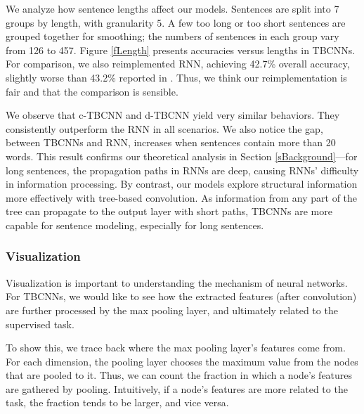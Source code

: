 \documentclass[11pt,a4paper]{article}
\begin{document}
We analyze how sentence lengths affect our models.
Sentences are split into 7 groups by length, with granularity 5.
A few too long or too short sentences are grouped together for smoothing;
the numbers of sentences in each group vary from 126 to 457.
Figure \ref{fLength} presents accuracies versus lengths
in TBCNNs.
For comparison, we also reimplemented RNN, achieving 42.7\% overall accuracy,
slightly worse than 43.2\% reported in .
Thus, we think
our reimplementation is fair and that the comparison is sensible.

We observe that c-TBCNN and  d-TBCNN yield very similar behaviors.
They consistently outperform the RNN in all scenarios.
We also notice the gap, between TBCNNs and RNN, increases
when sentences contain more than 20 words.
This result confirms our theoretical analysis in Section \ref{sBackground}---for 
long sentences, the propagation paths in RNNs are deep, causing
RNNs' difficulty in information processing.
By contrast, our models explore structural information more effectively
with tree-based convolution. As information from any part of the tree
can propagate to the output layer with short paths,
TBCNNs are more capable for sentence modeling, especially for long sentences.


\subsubsection{Visualization}

Visualization is important to understanding
the mechanism of neural networks.
For TBCNNs, we would like to see how the extracted features (after convolution)
are further processed by the max pooling layer, and ultimately related to the supervised task.

To show this, we trace back where the max pooling layer's features come from.
For each dimension, the pooling layer chooses the maximum value from the nodes
that are pooled to it.
Thus, we can count the fraction in which a node's features
are gathered by pooling.
Intuitively, if a node's features are more related to the task,
the fraction tends to be larger, and vice versa.
\end{document}
